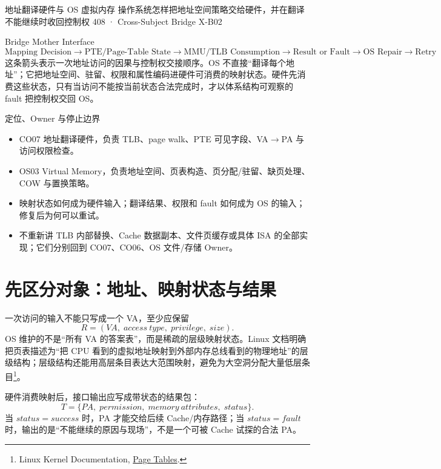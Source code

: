 \documentclass[UTF8,fontset=none,11pt,a4paper]{ctexart}
\begin{document}
\handbooktitle
  {地址翻译硬件与 OS 虚拟内存}
  {操作系统怎样把地址空间策略交给硬件，并在翻译不能继续时收回控制权}
  {408 · Cross-Subject Bridge X-B02}

\begin{corebox}{Bridge Mother Interface}
\[
\boxed{\text{Mapping Decision}\to\text{PTE/Page-Table State}\to\text{MMU/TLB Consumption}\to\text{Result or Fault}\to\text{OS Repair}\to\text{Retry}}
\]
这条箭头表示一次地址访问的因果与控制权交接顺序。OS 不直接“翻译每个地址”；它把地址空间、驻留、权限和属性编码进硬件可消费的映射状态。硬件先消费这些状态，只有当访问不能按当前状态合法完成时，才以体系结构可观察的 fault 把控制权交回 OS。
\end{corebox}

\begin{methodbox}{定位、Owner 与停止边界}
\begin{itemize}
\item {}CO07 地址翻译硬件，负责 TLB、page walk、PTE 可见字段、VA\(\to\)PA 与访问权限检查。
\item {}OS03 Virtual Memory，负责地址空间、页表构造、页分配/驻留、缺页处理、COW 与置换策略。
\item {}映射状态如何成为硬件输入；翻译结果、权限和 fault 如何成为 OS 的输入；修复后为何可以重试。
\item {}不重新讲 TLB 内部替换、Cache 数据副本、文件页缓存或具体 ISA 的全部实现；它们分别回到 CO07、CO06、OS 文件/存储 Owner。
\end{itemize}
\end{methodbox}

\section{先区分对象：地址、映射状态与结果}
一次访问的输入不能只写成一个 VA，至少应保留
\[
  R=(VA,\;access\ type,\;privilege,\;size).
\]
OS 维护的不是“所有 VA 的答案表”，而是稀疏的层级映射状态。Linux 文档明确把页表描述为“把 CPU 看到的虚拟地址映射到外部内存总线看到的物理地址”的层级结构；层级结构还能用高层条目表达大范围映射，避免为大空洞分配大量低层条目\footnote{Linux Kernel Documentation, \href{https://docs.kernel.org/mm/page_tables.html}{Page Tables}.}。

硬件消费映射后，接口输出应写成带状态的结果包：
\[
  T=\{PA,\;permission,\;memory\ attributes,\;status\}.
\]
当 \(status=success\) 时，PA 才能交给后续 Cache/内存路径；当 \(status=fault\) 时，输出的是“不能继续的原因与现场”，不是一个可被 Cache 试探的合法 PA。
\end{document}
